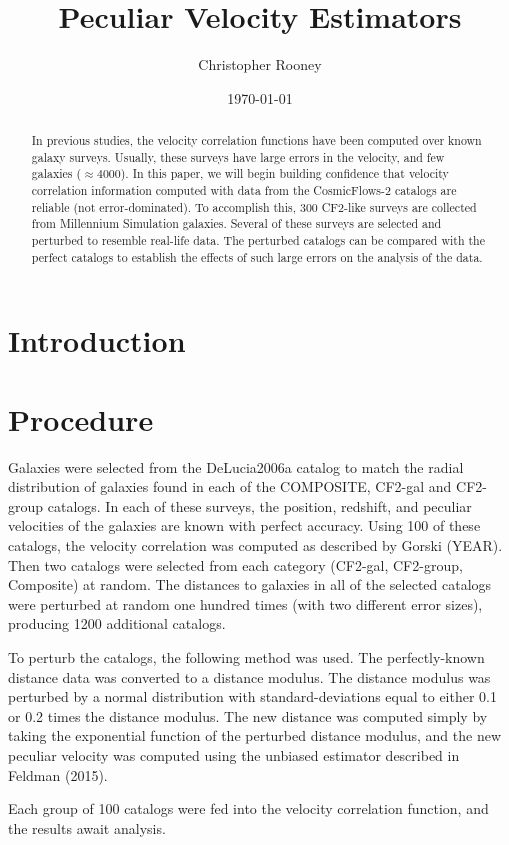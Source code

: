 \documentclass[usenatbib]{mn2e}
\begin{document}
\author{Christopher Rooney}
\date{\today}
\title{Peculiar Velocity Estimators}
\maketitle

\begin{abstract}
In previous studies, the velocity correlation functions have been computed over known galaxy surveys. Usually, these surveys have large errors in the velocity, and few galaxies ($\approx 4000$). In this paper, we will begin building confidence that velocity correlation information computed with data from the CosmicFlows-2 catalogs are reliable (not error-dominated). To accomplish this, 300 CF2-like surveys are collected from Millennium Simulation galaxies. Several of these surveys are selected and perturbed to resemble real-life data. The perturbed catalogs can be compared with the perfect catalogs to establish the effects of such large errors on the analysis of the data.
\end{abstract}

\section{Introduction}


\section{Procedure}
Galaxies were selected from the DeLucia2006a catalog to match the radial distribution of galaxies found in each of the COMPOSITE, CF2-gal and CF2-group catalogs. In each of these surveys, the position, redshift, and peculiar velocities of the galaxies are known with perfect accuracy. Using 100 of these catalogs, the velocity correlation was computed as described by Gorski (YEAR). Then two catalogs were selected from each category (CF2-gal, CF2-group, Composite) at random. The distances to galaxies in all of the selected catalogs were perturbed at random one hundred times (with two different error sizes), producing 1200 additional catalogs. 

To perturb the catalogs, the following method was used. The perfectly-known distance data was converted to a distance modulus. The distance modulus was perturbed by a normal distribution with standard-deviations equal to either 0.1 or 0.2 times the distance modulus. The new distance was computed simply by taking the exponential function of the perturbed distance modulus, and the new peculiar velocity was computed using the unbiased estimator described in Feldman (2015).

Each group of 100 catalogs were fed into the velocity correlation function, and the results await analysis.




\end{document}
